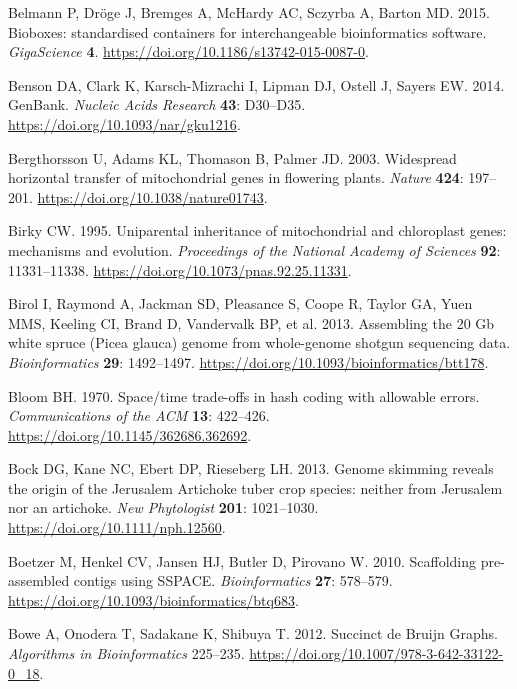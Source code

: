 \documentclass[
  12pt,
  oneside,
  openany]{book}
\begin{document}
\leavevmode\hypertarget{ref-Belmann_2015}{}%
Belmann P, Dröge J, Bremges A, McHardy AC, Sczyrba A, Barton MD. 2015. Bioboxes: standardised containers for interchangeable bioinformatics software. \emph{GigaScience} \textbf{4}. \url{https://doi.org/10.1186/s13742-015-0087-0}.

\leavevmode\hypertarget{ref-Benson_2014}{}%
Benson DA, Clark K, Karsch-Mizrachi I, Lipman DJ, Ostell J, Sayers EW. 2014. GenBank. \emph{Nucleic Acids Research} \textbf{43}: D30--D35. \url{https://doi.org/10.1093/nar/gku1216}.

\leavevmode\hypertarget{ref-Bergthorsson_2003}{}%
Bergthorsson U, Adams KL, Thomason B, Palmer JD. 2003. Widespread horizontal transfer of mitochondrial genes in flowering plants. \emph{Nature} \textbf{424}: 197--201. \url{https://doi.org/10.1038/nature01743}.

\leavevmode\hypertarget{ref-Birky_1995}{}%
Birky CW. 1995. Uniparental inheritance of mitochondrial and chloroplast genes: mechanisms and evolution. \emph{Proceedings of the National Academy of Sciences} \textbf{92}: 11331--11338. \url{https://doi.org/10.1073/pnas.92.25.11331}.

\leavevmode\hypertarget{ref-Birol_2013}{}%
Birol I, Raymond A, Jackman SD, Pleasance S, Coope R, Taylor GA, Yuen MMS, Keeling CI, Brand D, Vandervalk BP, et al. 2013. Assembling the 20 Gb white spruce (Picea glauca) genome from whole-genome shotgun sequencing data. \emph{Bioinformatics} \textbf{29}: 1492--1497. \url{https://doi.org/10.1093/bioinformatics/btt178}.

\leavevmode\hypertarget{ref-Bloom_1970}{}%
Bloom BH. 1970. Space/time trade-offs in hash coding with allowable errors. \emph{Communications of the ACM} \textbf{13}: 422--426. \url{https://doi.org/10.1145/362686.362692}.

\leavevmode\hypertarget{ref-Bock_2013}{}%
Bock DG, Kane NC, Ebert DP, Rieseberg LH. 2013. Genome skimming reveals the origin of the Jerusalem Artichoke tuber crop species: neither from Jerusalem nor an artichoke. \emph{New Phytologist} \textbf{201}: 1021--1030. \url{https://doi.org/10.1111/nph.12560}.

\leavevmode\hypertarget{ref-Boetzer_2010}{}%
Boetzer M, Henkel CV, Jansen HJ, Butler D, Pirovano W. 2010. Scaffolding pre-assembled contigs using SSPACE. \emph{Bioinformatics} \textbf{27}: 578--579. \url{https://doi.org/10.1093/bioinformatics/btq683}.

\leavevmode\hypertarget{ref-Bowe_2012}{}%
Bowe A, Onodera T, Sadakane K, Shibuya T. 2012. Succinct de Bruijn Graphs. \emph{Algorithms in Bioinformatics} 225--235. \url{https://doi.org/10.1007/978-3-642-33122-0_18}.
\end{document}
